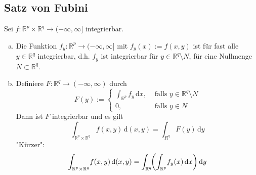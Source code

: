 \subsection{Satz von Fubini} %
\label{sub:73}
Sei $f : \mathds{R}^p \times \mathds{R}^q \to (-\infty, \infty]$ integrierbar. 
\begin{enumerate}[a)]
	\item Die Funktion $f_y : \mathds{R}^p \to (-\infty, \infty]$ mit $f_y(x) := f(x,y)$ ist für fast alle $y \in \mathds{R}^q$ integrierbar, d.h. $f_y$ ist integrierbar für
	$y \in \mathds{R}^q \setminus N$, für eine Nullmenge $N \subset \mathds{R}^q$.
	\item Definiere $F : \mathds{R}^q \to (-\infty,\infty)$ durch
	\[
		F(y) := \begin{cases}
			\int_{\mathds{R}^p}\! f_y  \, \mathrm{d}x , &\text{ falls }y \in \mathds{R}^q \setminus N\\
			0 ,&\text{ falls } y \in N
		\end{cases}
	\]
	Dann ist $F$ integrierbar und es gilt
	\[
		\int_{\mathds{R}^p \times \mathds{R}^q}\! f(x,y)  \, \mathrm{d}(x,y) = \int_{R^q} F(y)  \, \mathrm{d}y
	\]
	"{}Kürzer"{}:
	\[
		\int_{\mathds{R}^p \times \mathds{R}^q}\! f(x,y)  \, \mathrm{d}(x,y) = \int_{\mathds{R}^q}\! \enbrace*{\int_{\mathds{R}^p}\! f_y(x)  \, \mathrm{d}x }  
		\, \mathrm{d}y 
	\]
\end{enumerate}
